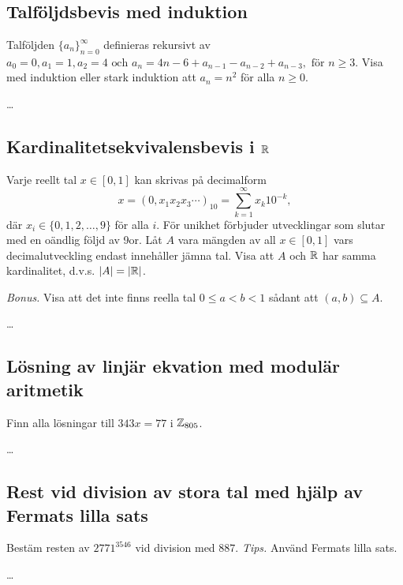 \documentclass{seminar}
\begin{document}
\section{}

\subsection{Talföljdsbevis med induktion}
\begin{questionquote}
	Talföljden $\{a_n\}_{n=0}^{\infty}$ definieras rekursivt av
	$a_0=0, a_1=1, a_2=4 \text{ och } a_n=4n-6+a_{n-1}-a_{n-2}+a_{n-3},\text{ för }n\ge3.$
	Visa med induktion eller stark induktion att $a_n=n^2$ för alla $n\ge0$.
\end{questionquote}

\dots

\clearpage
\subsection{Kardinalitetsekvivalensbevis i $\mathbb{R}$}
\begin{questionquote}
	Varje reellt tal $x\in[0, 1]$ kan skrivas på decimalform
	$$x=(0, x_1x_2x_3\cdots)_{10}=\sum_{k=1}^{\infty} x_k10^{-k},$$
	där $x_i\in\{0,1,2,\dots,9\}$ för alla $i$.
	För unikhet förbjuder utvecklingar som slutar med en oändlig följd av 9or.
	Låt $A$ vara mängden av all $x\in[0,1]$ vars decimalutveckling endast innehåller jämna tal.
	Visa att $A$ och $\mathbb{R}$ har samma kardinalitet, d.v.s. $|A|=|\mathbb{R}|$.

	\textit{Bonus.} Visa att det inte finns reella tal
	$0\le a < b < 1$ sådant att $(a, b)\subseteq A$.
\end{questionquote}

\dots

\clearpage
\subsection{Lösning av linjär ekvation med modulär aritmetik}
\begin{questionquote}
	Finn alla lösningar till $343x=77$ i $\mathbb{Z}_{805}$.
\end{questionquote}

\dots

\clearpage
\subsection{Rest vid division av stora tal med hjälp av Fermats lilla sats}
\begin{questionquote}
	Bestäm resten av $2771^{3546}$ vid division med $887$.
	\textit{Tips.} Använd Fermats lilla sats.
\end{questionquote}

\dots
\end{document}
